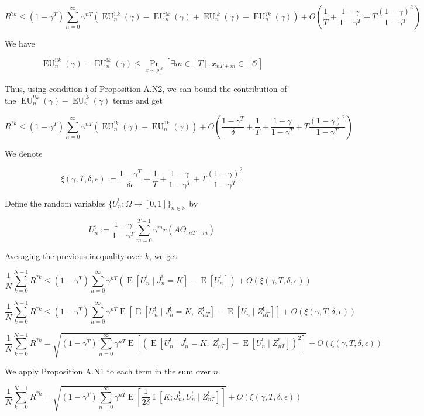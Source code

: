 \documentclass[a4paper]{article}
\newcommand{\E}[1]{\underset{#1}{\operatorname{E}}}
\newcommand{\I}[1]{\underset{#1}{\operatorname{I}}}
\newcommand{\Nats}{\mathbb{N}}
\newcommand{\Sq}[2]{\{#1\}_{#2 \in \Nats}}
\newcommand{\Sqn}[1]{\Sq{#1}{n}}
\newcommand{\Ob}{\mathcal{O}}
\newcommand{\Ado}{\bar{\Ob}}
\newcommand{\EU}{\operatorname{EU}}
\newcommand{\J}{J}
\begin{document}
$$R^{?k} \leq (1-\gamma^T)\sum_{n=0}^\infty \gamma^{nT} \left(\EU^{!!k}_n(\gamma)-\EU^{!k}_n(\gamma)+\EU^{!k}_n(\gamma)-\EU^{?k}_n(\gamma)\right) + O\left(\frac{1}{T}+\frac{1-\gamma}{1-\gamma^T}+T\frac{(1-\gamma)^2}{1-\gamma^T}\right)$$

We have

$$\EU^{!!k}_n(\gamma)-\EU^{!k}_n(\gamma) \leq \Pr_{x\sim\rho^{!k}_n}\left[\exists m \in [T]: x_{nT+m} \in \bot\Ado\right]$$

Thus, using condition i of Proposition A.N2, we can bound the contribution of the $\EU^{!!k}_n(\gamma)-\EU^{!k}_n(\gamma)$ terms and get

$$R^{?k} \leq (1-\gamma^T)\sum_{n=0}^\infty \gamma^{nT} \left(\EU^{!k}_n(\gamma)-\EU^{?k}_n(\gamma)\right) + O\left(\frac{1-\gamma^T}{\delta}+\frac{1}{T}+\frac{1-\gamma}{1-\gamma^T}+T\frac{(1-\gamma)^2}{1-\gamma^T}\right)$$

We denote

$$\xi(\gamma,T,\delta,\epsilon):=\frac{1-\gamma^T}{\delta\epsilon}+\frac{1}{T}+\frac{1-\gamma}{1-\gamma^T}+T\frac{(1-\gamma)^2}{1-\gamma^T}$$

Define the random variables $\Sqn{U^!_n : \Omega \rightarrow [0,1]}$ by 

$$U^!_n:=\frac{1-\gamma}{1-\gamma^T}\sum_{m=0}^{T-1} \gamma^{m} r\left(A\Theta^!_{:nT+m}\right)$$

Averaging the previous inequality over $k$, we get

$$\frac{1}{N}\sum_{k=0}^{N-1}R^{?k} \leq (1-\gamma^T)\sum_{n=0}^\infty \gamma^{nT} \left(\E{}\left[U^!_n \mid \J^!_n = K\right]-\E{}\left[U^!_n\right]\right) + O\left(\xi(\gamma,T,\delta,\epsilon)\right)$$

$$\frac{1}{N}\sum_{k=0}^{N-1}R^{?k} \leq (1-\gamma^T)\sum_{n=0}^\infty \gamma^{nT} \E{}\left[\E{}\left[U^!_n \mid \J^!_n = K,\ Z^!_{nT}\right]-\E{}\left[U^!_n \mid Z^!_{nT}\right]\right] + O\left(\xi(\gamma,T,\delta,\epsilon)\right)$$

$$\frac{1}{N}\sum_{k=0}^{N-1}R^{?k} = \sqrt{(1-\gamma^T)\sum_{n=0}^\infty \gamma^{nT} \E{}\left[\left(\E{}\left[U^!_n \mid \J^!_n = K,\ Z^!_{nT}\right]-\E{}\left[U^!_n \mid Z^!_{nT}\right]\right)^2\right]} + O\left(\xi(\gamma,T,\delta,\epsilon)\right)$$

We apply Proposition A.N1 to each term in the sum over $n$.

$$\frac{1}{N}\sum_{k=0}^{N-1}R^{?k} = \sqrt{(1-\gamma^T)\sum_{n=0}^\infty \gamma^{nT} \E{}\left[\frac{1}{2\delta}\I{}\left[K;\J^!_n,U^!_n \mid Z^!_{nT}\right]\right]} + O\left(\xi(\gamma,T,\delta,\epsilon)\right)$$
\end{document}
